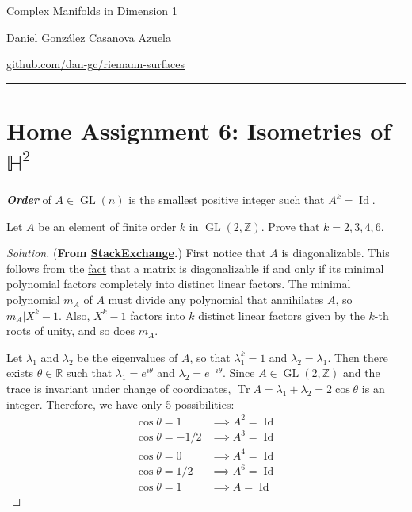 \documentclass{article}
\newcommand{\R}{\mathbb{R}}
\newcommand{\Z}{\mathbb{Z}}
\renewcommand{\H}{\mathbb{H}}
\DeclareMathOperator{\Id}{Id}
\DeclareMathOperator{\Tr}{Tr}
\DeclareMathOperator{\GL}{GL}
\begin{document}
\begin{minipage}{\textwidth}
	\begin{minipage}{.5\textwidth}
		Complex Manifolds in Dimension 1\\
	\end{minipage}%
	\begin{minipage}{.5\textwidth}
		\raggedleft
		Daniel González Casanova Azuela\par
		{\small\href{https://github.com/dan-gc/riemann-surfaces}{github.com/dan-gc/riemann-surfaces}}
	\end{minipage}%
\end{minipage}\vspace{.2cm}\hrule
\section{Home Assignment 6: Isometries of $\H^2$}
\setcounter{section}{6}
\begin{defn}
	\textbf{\textit{Order}} of $A\in\GL(n)$ is the smallest positive integer such that $A^k=\Id$.
\end{defn}
\begin{exercise}
	Let $A$ be an element of finite order $k$ in $\GL(2,\Z)$. Prove that $k=2,3,4,6$.
\end{exercise}
\begin{proof}[Solution]
	(\textbf{From \href{https://math.stackexchange.com/questions/3759724/show-that-an-element-of-gl-2-mathbbz-has-order-1-2-3-4-6-or-infty}{StackExchange}.}) 
	First notice that $A$ is diagonalizable. This follows from the \href{https://en.wikipedia.org/wiki/Minimal_polynomial_(linear_algebra)#Applications}{fact} that a matrix is diagonalizable if and only if its minimal polynomial factors completely into distinct linear factors. The minimal polynomial $m_A$ of $A$ must divide any polynomial that annihilates $A$, so $m_A|X^k-1$. Also, $X^k-1$ factors into $k$ distinct linear factors given by the $k$-th roots of unity, and so does $m_A$.
	
	Let $\lambda_1$ and $\lambda_2$ be the eigenvalues of $A$, so that $\lambda_1^k=1$ and $\overline{\lambda}_2=\lambda_1$. Then there exists $\theta\in\R$ such that $\lambda_1=e^{i\theta}$ and $\lambda_2=e^{-i\theta}$. Since $A\in\GL(2,\Z)$ and the trace is invariant under change of coordinates, $\Tr A=\lambda_1+\lambda_2=2\cos\theta$ is an integer. Therefore, we have only 5 possibilities:
	\begin{align*}
		\cos\theta=1&\implies A^2=\Id\\
		\cos\theta=-1/2&\implies A^3=\Id\\
		\cos\theta=0&\implies A^4=\Id\\
		\cos\theta=1/2&\implies A^6=\Id\\
		\cos\theta=1&\implies A=\Id
	\end{align*}
\end{proof}
\end{document}
